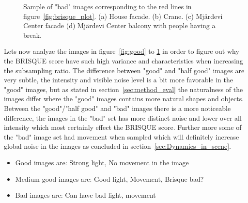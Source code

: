 \begin{figure}[H]
\begin{minipage}[t]{0.245\textwidth}
    \subcaption{}
    \label{fig:bad4}
\end{minipage}
    \caption{Sample of "bad" images corresponding to the red lines in figure~\ref{fig:brisque_plot}.
    (a)  House facade. (b) Crane. (c) Mjärdevi Center facade (d) Mjärdevi Center balcony with people having a break.}
    \label{fig:bad}
\end{figure}


Lets now analyze the images in figure~\ref{fig:good} to \ref{fig:bad} in order to figure out why the BRISQUE score have such high variance and characteristics when increasing the subsampling ratio. The difference between "good" and "half good" images are very subtle, the intensity and visible noise level is a bit more favorable in the "good" images, but as stated in section~\ref{sec:method_eval} the naturalness of the images differ where the "good" images contains more natural shapes and objects. Between the "good"/"half good" and "bad" images there is a more noticeable difference, the images in the "bad" set has more distinct noise and lower over all intensity which most certainly effect the BRISQUE score. Further more some of the "bad" image set had movement when sampled which will definitely increase global noise in the images as concluded in section~\ref{sec:Dynamics_in_scene}.   


\begin{itemize}
    \item Good images are: Strong light, No movement in the image
    \item Medium good images are: Good light, Movement, Brisque bad?
    \item Bad images are: Can have bad light, movement 
\end{itemize}



\pagebreak

